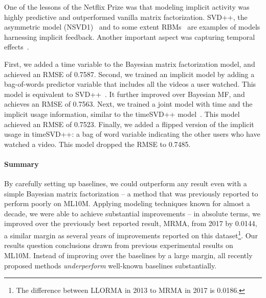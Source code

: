 \documentclass{article}
\newcommand\rmsebfmuit{0.7587}
\newcommand\rmsebfmuiui{0.7563}
\newcommand\rmsebfmuitui{0.7523}
\newcommand\rmsebfmuituiiu{0.7485}
\begin{document}
One of the lessons of the Netflix Prize was that modeling implicit activity was highly predictive and outperformed vanilla matrix factorization.
SVD++\cite{koren:kdd08}, the asymmetric model (NSVD1)~\cite{paterek:kddcup07} and to some extent RBMs~\cite{salakhutdinov:icml07} are examples of models harnessing implicit feedback.
Another important aspect was capturing temporal effects~\cite{koren:kdd09}.

First, we added a time variable to the Bayesian matrix factorization model, and achieved an RMSE of \rmsebfmuit.
Second, we trained an implicit model by adding a bag-of-words predictor variable that includes all the videos a user watched.
This model is equivalent to SVD++~\cite{koren:kdd08,rendle:tist12}.
It further improved over Bayesian MF, and achieves an RMSE of \rmsebfmuiui.
Next, we trained a joint model with time and the implicit usage information, similar to the timeSVD++ model~\cite{koren:kdd09}.
This model achieved an RMSE of \rmsebfmuitui.
Finally, we added a flipped version of the implicit usage in timeSVD++: a bag of word variable indicating the other users who have watched a video.
This model dropped the RMSE to \rmsebfmuituiiu.







\paragraph{Summary}
By carefully setting up baselines, we could outperform any result even with a simple Bayesian matrix factorization -- a method that was previously reported to perform poorly on ML10M.
Applying modeling techniques known for almost a decade, we were able to achieve substantial improvements -- in absolute terms, we improved over the previously best reported result, MRMA, from 2017 by 0.0144, a similar margin as several years of improvements reported on this dataset\footnote{The difference between LLORMA in 2013 to MRMA in 2017 is 0.0186.}.
Our results question conclusions drawn from previous experimental results on ML10M.
Instead of improving over the baselines by a large margin, all recently proposed methods \emph{underperform} well-known baselines substantially.



\pagebreak[4]
\end{document}
